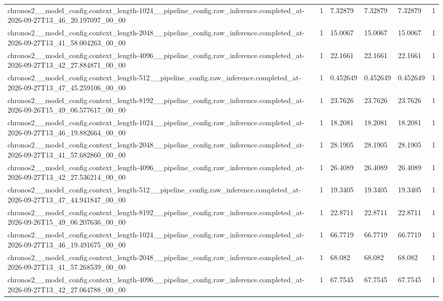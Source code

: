 \begin{tabular}{llllll}
chronos2\_\_model\_config.context\_length-1024\_\_pipeline\_config.raw\_inference.completed\_at-2026-09-27T13\_46\_20.197097\_00\_00 & 1 & 7.32879 & 7.32879 & 7.32879 & 1 \\
chronos2\_\_model\_config.context\_length-2048\_\_pipeline\_config.raw\_inference.completed\_at-2026-09-27T13\_41\_58.004263\_00\_00 & 1 & 15.0067 & 15.0067 & 15.0067 & 1 \\
chronos2\_\_model\_config.context\_length-4096\_\_pipeline\_config.raw\_inference.completed\_at-2026-09-27T13\_42\_27.884871\_00\_00 & 1 & 22.1661 & 22.1661 & 22.1661 & 1 \\
chronos2\_\_model\_config.context\_length-512\_\_pipeline\_config.raw\_inference.completed\_at-2026-09-27T13\_47\_45.259106\_00\_00 & 1 & 0.452649 & 0.452649 & 0.452649 & 1 \\
chronos2\_\_model\_config.context\_length-8192\_\_pipeline\_config.raw\_inference.completed\_at-2026-09-26T15\_49\_06.577617\_00\_00 & 1 & 23.7626 & 23.7626 & 23.7626 & 1 \\
chronos2\_\_model\_config.context\_length-1024\_\_pipeline\_config.raw\_inference.completed\_at-2026-09-27T13\_46\_19.882664\_00\_00 & 1 & 18.2081 & 18.2081 & 18.2081 & 1 \\
chronos2\_\_model\_config.context\_length-2048\_\_pipeline\_config.raw\_inference.completed\_at-2026-09-27T13\_41\_57.682860\_00\_00 & 1 & 28.1905 & 28.1905 & 28.1905 & 1 \\
chronos2\_\_model\_config.context\_length-4096\_\_pipeline\_config.raw\_inference.completed\_at-2026-09-27T13\_42\_27.536214\_00\_00 & 1 & 26.4089 & 26.4089 & 26.4089 & 1 \\
chronos2\_\_model\_config.context\_length-512\_\_pipeline\_config.raw\_inference.completed\_at-2026-09-27T13\_47\_44.941847\_00\_00 & 1 & 19.3405 & 19.3405 & 19.3405 & 1 \\
chronos2\_\_model\_config.context\_length-8192\_\_pipeline\_config.raw\_inference.completed\_at-2026-09-26T15\_49\_06.207636\_00\_00 & 1 & 22.8711 & 22.8711 & 22.8711 & 1 \\
chronos2\_\_model\_config.context\_length-1024\_\_pipeline\_config.raw\_inference.completed\_at-2026-09-27T13\_46\_19.491675\_00\_00 & 1 & 66.7719 & 66.7719 & 66.7719 & 1 \\
chronos2\_\_model\_config.context\_length-2048\_\_pipeline\_config.raw\_inference.completed\_at-2026-09-27T13\_41\_57.268539\_00\_00 & 1 & 68.082 & 68.082 & 68.082 & 1 \\
chronos2\_\_model\_config.context\_length-4096\_\_pipeline\_config.raw\_inference.completed\_at-2026-09-27T13\_42\_27.064788\_00\_00 & 1 & 67.7545 & 67.7545 & 67.7545 & 1 \\

\end{tabular}
